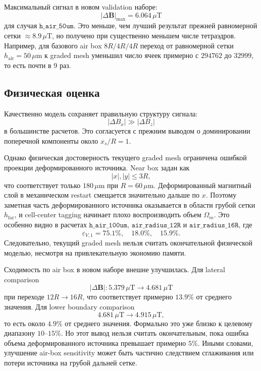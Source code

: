 \documentclass[12pt,a4paper]{article}
\begin{document}
Максимальный сигнал в новом validation наборе:
\[
    |\Delta\mathbf B|_{\max}=6.064\,\mu\mathrm{T}
\]
для случая \(\texttt{h\_air\_50um}\). Это меньше, чем лучший результат прежней
равномерной сетки \(\approx 8.9\,\mu\mathrm{T}\), но получено при существенно
меньшем числе тетраэдров. Например, для базового air box \(8R/4R/4R\) переход
от равномерной сетки \(h_{\mathrm{air}}=50\,\mu\mathrm{m}\) к graded mesh
уменьшил число ячеек примерно с \(294762\) до \(32999\), то есть почти в 9 раз.

\subsection*{Физическая оценка}

Качественно модель сохраняет правильную структуру сигнала:
\[
    |\Delta B_x| \gg |\Delta B_z|
\]
в большинстве расчетов. Это согласуется с прежним выводом о доминировании
поперечной компоненты около \(x_s/R=1\).

Однако физическая достоверность текущего graded mesh ограничена ошибкой
проекции деформированного источника. Near box задан как
\[
    |x|,|y|\le 3R,
\]
что соответствует только \(180\,\mu\mathrm{m}\) при \(R=60\,\mu\mathrm{m}\).
Деформированный магнитный слой в механическом restart смещается значительно
дальше по \(x\). Поэтому заметная часть деформированного источника оказывается
в области грубой сетки \(h_{\mathrm{far}}\), и cell-center tagging начинает
плохо воспроизводить объем \(\Omega_m\). Это особенно видно в расчетах
\(\texttt{h\_air\_100um}\), \(\texttt{air\_radius\_12R}\) и
\(\texttt{air\_radius\_16R}\), где
\[
    \varepsilon_{V,1}=75.1\%,\quad 18.0\%,\quad 15.9\%.
\]
Следовательно, текущий graded mesh нельзя считать окончательной физической
моделью, несмотря на привлекательную экономию памяти.

Сходимость по air box в новом наборе внешне улучшилась. Для lateral comparison
\[
    |\Delta\mathbf B|:
    5.379\,\mu\mathrm{T}
    \rightarrow
    4.681\,\mu\mathrm{T}
\]
при переходе \(12R\rightarrow 16R\), что соответствует примерно \(13.9\%\)
от среднего значения. Для lower boundary comparison
\[
    4.681\,\mu\mathrm{T}
    \rightarrow
    4.915\,\mu\mathrm{T},
\]
то есть около \(4.9\%\) от среднего значения. Формально это уже близко к
целевому диапазону \(10\text{--}15\%\). Но этот вывод нельзя считать
окончательным, пока ошибка объема деформированного источника превышает
примерно \(5\%\). Иными словами, улучшение air-box sensitivity может быть
частично следствием сглаживания или потери источника на грубой дальней сетке.
\end{document}
